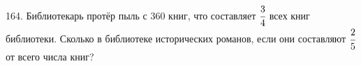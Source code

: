 164. Библиотекарь протёр пыль с 360 книг, что составляет $\cfrac{3}{4}$ всех книг библиотеки. Сколько в библиотеке исторических романов, если они составляют $\cfrac{2}{5}$ от всего числа книг?\\
